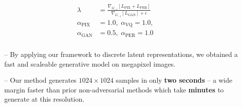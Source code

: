\documentclass[14pt,margin=0.5in,innermargin=0in,blockverticalspace=-0.1in,colspace=-1.2cm]{tikzposter}
\begin{document}
\begin{columns}
{\begin{tcolorbox}[boxsep=0pt,top=0cm,bottom=0.6cm,adjusted title={\huge\bf Proposed Method},colbacktitle=colorOne]
{\begin{minipage}{0.49\linewidth}
\begin{align*}
            \begin{split}
                \lambda &= \frac{\nabla_{G_{-1}}[L_\text{PIX} +
                L_\text{PER}]}{\nabla_{G_{-1}}[L_\text{GAN}] + \epsilon}\\
                \alpha_\text{PIX} &= 1.0,\; \alpha_\text{VQ} = 1.0,\\
                \alpha_\text{GAN} &= 0.5,\; \alpha_\text{PER} = 1.0 \\
            \end{split}
            \end{align*}
        \end{minipage}
            }
        \vspace{0.4cm}
        {
        \Large
        \begin{itemize}
            \item[--] By applying our framework to discrete latent
                representations, we obtained a fast and scaleable generative
                model on megapixel images.
            \item[--] Our method generates $1024 \times 1024$ samples in only
                \textbf{two seconds} -- a wide margin faster than prior non-adversarial
                methods which take \textbf{minutes} to generate at this resolution.
        \end{itemize}
        }


\end{tcolorbox}}
\end{columns}
\end{document}
